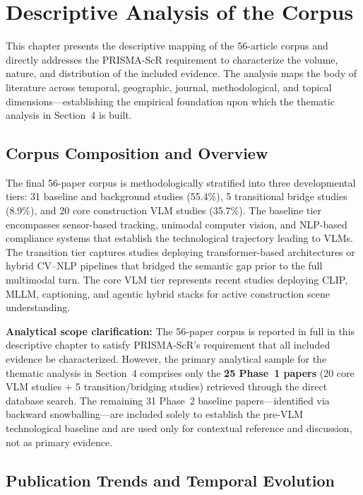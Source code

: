 \documentclass[10pt,letterpaper]{article}
\begin{document}
\section{Descriptive Analysis of the Corpus}

This chapter presents the descriptive mapping of the 56-article corpus and directly addresses the PRISMA-ScR requirement to characterize the volume, nature, and distribution of the included evidence. The analysis maps the body of literature across temporal, geographic, journal, methodological, and topical dimensions---establishing the empirical foundation upon which the thematic analysis in Section~4 is built.

\subsection{Corpus Composition and Overview}

The final 56-paper corpus is methodologically stratified into three developmental tiers: 31 baseline and background studies (55.4\%), 5 transitional bridge studies (8.9\%), and 20 core construction VLM studies (35.7\%). The baseline tier encompasses sensor-based tracking, unimodal computer vision, and NLP-based compliance systems that establish the technological trajectory leading to VLMs. The transition tier captures studies deploying transformer-based architectures or hybrid CV--NLP pipelines that bridged the semantic gap prior to the full multimodal turn. The core VLM tier represents recent studies deploying CLIP, MLLM, captioning, and agentic hybrid stacks for active construction scene understanding.

\textbf{Analytical scope clarification:} The 56-paper corpus is reported in full in this descriptive chapter to satisfy PRISMA-ScR's requirement that all included evidence be characterized. However, the primary analytical sample for the thematic analysis in Section~4 comprises only the \textbf{25 Phase~1 papers} (20 core VLM studies + 5 transition/bridging studies) retrieved through the direct database search. The remaining 31 Phase~2 baseline papers---identified via backward snowballing---are included solely to establish the pre-VLM technological baseline and are used only for contextual reference and discussion, not as primary evidence.

\subsection{Publication Trends and Temporal Evolution}
\end{document}
